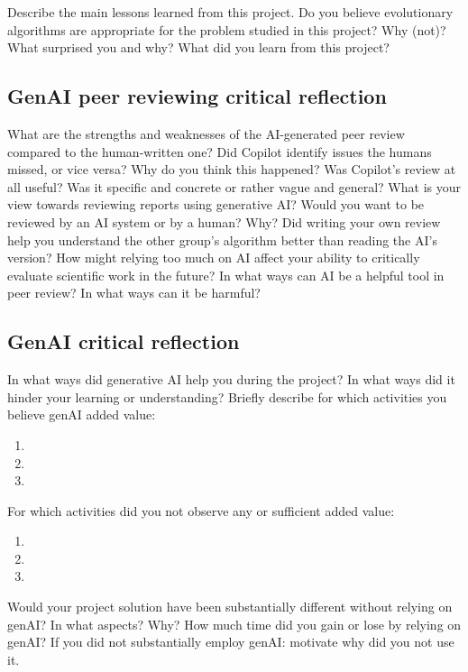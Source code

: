 \documentclass[a4paper,10pt]{article}
\newcommand{\ReplaceMe}[1]{{\color{blue}#1}}
\begin{document}
\ReplaceMe{Describe the main lessons learned from this project. Do you believe evolutionary algorithms are appropriate for the problem studied in this project? Why (not)? What surprised you and why? What did you learn from this project?}

\subsection{GenAI peer reviewing critical reflection} 
\ReplaceMe{What are the strengths and weaknesses of the AI-generated peer review compared to the human-written one? Did Copilot identify issues the humans missed, or vice versa? Why do you think this happened? Was Copilot's review at all useful? Was it specific and concrete or rather vague and general? What is your view towards reviewing reports using generative AI? Would you want to be reviewed by an AI system or by a human? Why? Did writing your own review help you understand the other group's algorithm better than reading the AI’s version? How might relying too much on AI affect your ability to critically evaluate scientific work in the future? In what ways can AI be a helpful tool in peer review? In what ways can it be harmful?}

\subsection{GenAI critical reflection}
\ReplaceMe{In what ways did generative AI help you during the project? In what ways did it hinder your learning or understanding?
Briefly describe for which activities you believe genAI added value:
\begin{enumerate}
 \item 
 \item
 \item
\end{enumerate}
For which activities did you not observe any or sufficient added value:
\begin{enumerate}
 \item 
 \item
 \item
\end{enumerate}
}

\ReplaceMe{Would your project solution have been substantially different without relying on genAI? In what aspects? Why? How much time did you gain or lose by relying on genAI? If you did not substantially employ genAI: motivate why did you not use it.}


\clearpage
\end{document}

